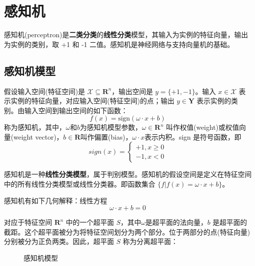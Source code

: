 \section{感知机}

感知机(perceptron)是\textbf{二类分类}的\textbf{线性分类}模型，其输入为实例的特征向量，输出为实例的类别，取 +1 和 -1 二值。感知机是神经网络与支持向量机的基础。

\subsection{感知机模型}

\begin{definition}[感知机]
    假设输入空间(特征空间)是 $\mathcal{X} \subseteq \mathbf{R}^n$，输出空间是 $y = \{+1,-1\}$。输入 $x \in \mathcal{X}$ 表示实例的特征向量，对应输入空间(特征空间)的点；输出 $y \in \mathbf{Y}$ 表示实例的类别。由输入空间到输出空间的如下函数：
    \begin{equation}
        f(x) = \text{sign} (\omega \cdot x + b)
    \end{equation}
    称为感知机，其中，$\omega$和$b$为感知机模型参数，$\omega \in \mathbf{R}^n$ 叫作权值(weight)或权值向量(weight vector)，$b\in \mathbf{R}$叫作偏置(bias)，$\omega \cdot x$表示内积。sign 是符号函数，即
    \begin{equation}
        sign(x) = \left\{ 
            \begin{aligned}
                +1,x\geq 0 \\
                -1,x<0 
            \end{aligned}
        \right.
    \end{equation}
\end{definition}

感知机是一种\textbf{线性分类模型}，属于判别模型。感知机的假设空间是定义在特征空间中的所有线性分类模型或线性分类器。即函数集合 $\{f|f(x) = \omega \cdot x + b\}$。

感知机有如下几何解释：线性方程 
\begin{equation}
    \omega \cdot x + b = 0
\end{equation}

对应于特征空间 $\mathbf{R}^n$ 中的一个超平面 $S$，其中$\omega$是超平面的法向量，$b$ 是超平面的截距。这个超平面被分为将特征空间划分为两个部分。位于两部分的点(特征向量)分别被分为正负两类。因此，超平面 $S$ 称为分离超平面：

\begin{figure}[H]
    \centering
    \caption{感知机模型}
    \label{感知机模型}
\end{figure}

